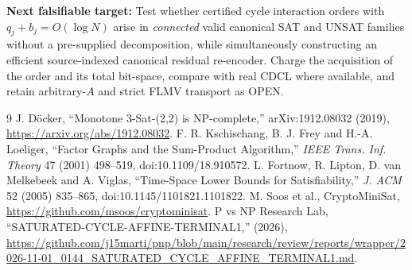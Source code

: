 \documentclass[11pt]{article}
\begin{document}
\noindent\textbf{Next falsifiable target:} Test whether certified cycle interaction orders with $q_j+b_j=O(\log N)$ arise in \emph{connected} valid canonical SAT and UNSAT families without a pre-supplied decomposition, while simultaneously constructing an efficient source-indexed canonical residual re-encoder. Charge the acquisition of the order and its total bit-space, compare with real CDCL where available, and retain arbitrary-$A$ and strict FLMV transport as OPEN.

\begin{thebibliography}{9}
 J. D\"ocker, ``Monotone 3-Sat-(2,2) is NP-complete,'' arXiv:1912.08032 (2019), \url{https://arxiv.org/abs/1912.08032}.
 F. R. Kschischang, B. J. Frey and H.-A. Loeliger, ``Factor Graphs and the Sum-Product Algorithm,'' \emph{IEEE Trans. Inf. Theory} 47 (2001) 498--519, doi:10.1109/18.910572.
 L. Fortnow, R. Lipton, D. van Melkebeek and A. Viglas, ``Time-Space Lower Bounds for Satisfiability,'' \emph{J. ACM} 52 (2005) 835--865, doi:10.1145/1101821.1101822.
 M. Soos et al., CryptoMiniSat, \url{https://github.com/msoos/cryptominisat}.
 P vs NP Research Lab, ``SATURATED-CYCLE-AFFINE-TERMINAL1,'' (2026), \url{https://github.com/j15marti/pnp/blob/main/research/review/reports/wrapper/2026-11-01_0144_SATURATED_CYCLE_AFFINE_TERMINAL1.md}.
\end{thebibliography}
\end{document}
